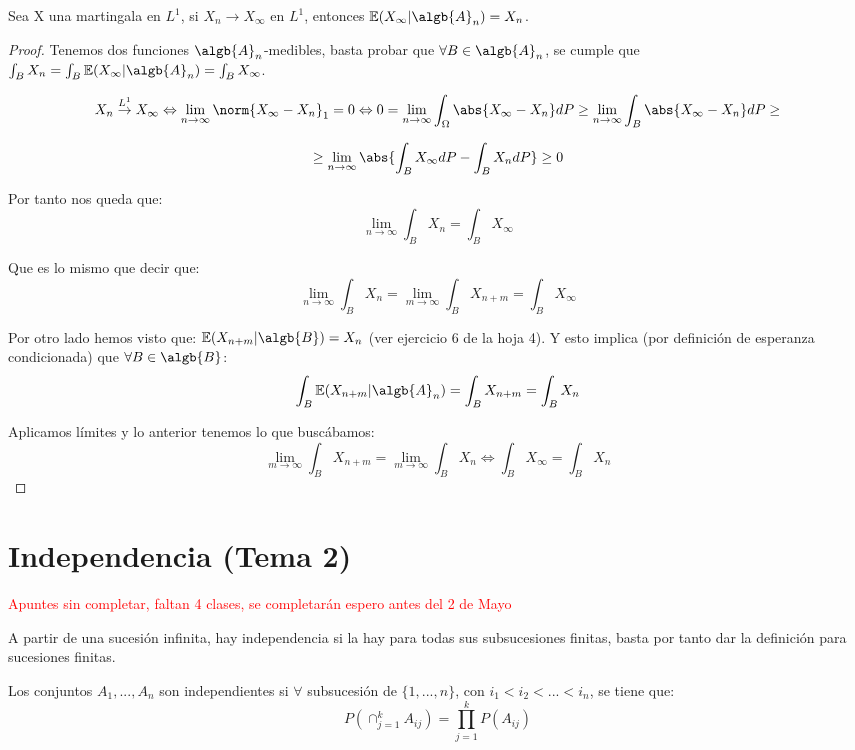 \documentclass{apuntes}
\begin{document}
\begin{theorem}
Sea X una martingala en $L^1$, si $X_n \rightarrow X_{\infty}$ en $L^1$, entonces $\mathbb{E}(X_{\infty}|\algb{A}_n)=X_n$.
\end{theorem}
\begin{proof}
Tenemos dos funciones $\algb{A}_n$-medibles, basta probar que $\forall B \in \algb{A}_n$, se cumple que $\int_B X_n = \int_B \mathbb{E}(X_{\infty}|\algb{A}_n) = \int_B X_{\infty}$.

\[
X_n \stackrel{L^1}{\rightarrow} X_{\infty} \Leftrightarrow \lim_{n \rightarrow \infty} \norm{X_{\infty}-X_n}_1=0 \Leftrightarrow 0= \lim_{n \rightarrow \infty} \int_{\Omega}\abs{X_{\infty}-X_n}dP \geq \lim_{n \rightarrow \infty} \int_B \abs{X_{\infty}-X_n}dP\geq
\]

\[
\geq \lim_{n \rightarrow \infty} \abs{\int_B X_{\infty}dP- \int_B X_n dP} \geq 0
\]


Por tanto nos queda que:
\[
\lim_{n \rightarrow \infty} \int_B X_n = \int_B X_{\infty}
\]

Que es lo mismo que decir que:
\[
\lim_{n \rightarrow \infty} \int_B X_n = \lim_{m \rightarrow \infty} \int_B X_{n+m} = \int_B X_{\infty}
\]

Por otro lado hemos visto que: $\mathbb{E}(X_{n+m}|\algb{B}) = X_n$ (ver ejercicio 6 de la hoja 4). Y esto implica (por definición de esperanza condicionada) que $\forall B \in \algb{B}$:
\[
\int_B \mathbb{E}(X_{n+m}|\algb{A}_n)=\int_B X_{n+m} = \int_B X_n
\]

Aplicamos límites y  lo anterior tenemos lo que buscábamos:
\[
\lim_{m \rightarrow \infty}\int_B X_{n+m} = \lim_{m \rightarrow \infty}\int_B X_{n} \Leftrightarrow \int_B X_{\infty} = \int_B X_n
\]

\end{proof}

\chapter{Independencia (Tema 2)}

\textcolor{red}{Apuntes sin completar, faltan 4 clases, se completarán espero antes del 2 de Mayo}

A partir de una sucesión infinita, hay independencia si la hay para todas sus subsucesiones finitas, basta por tanto dar la definición para sucesiones finitas.

\begin{defn}
Los conjuntos $A_1,...,A_n$ son independientes si $\forall$ subsucesión de $\{1,...,n\}$, con $i_1 < i_2 < ... < i_n$, se tiene que:
\[
P(\cap_{j=1}^k A_{ij}) = \prod_{j=1}^{k}P(A_{ij})
\]
\end{defn}
\end{document}
